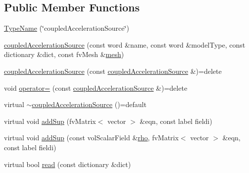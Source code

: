 \subsection*{Public Member Functions}
\begin{DoxyCompactItemize}
\item 
\hyperlink{classFoam_1_1fv_1_1coupledAccelerationSource_a5f7eeaec46b2fdf437db166c14c02bdd}{Type\+Name} (\char`\"{}coupled\+Acceleration\+Source\char`\"{})
\item 
\hyperlink{classFoam_1_1fv_1_1coupledAccelerationSource_af602dd4c3a64d8abdf58db6290d1f774}{coupled\+Acceleration\+Source} (const word \&name, const word \&model\+Type, const dictionary \&dict, const fv\+Mesh \&\hyperlink{createMeshesPostProcess_8H_a8bb1e58291d2d2b653e024a4f4bffe38}{mesh})
\item 
\hyperlink{classFoam_1_1fv_1_1coupledAccelerationSource_aa2a92d3cd5793fb4d2c14fd49a4abcdd}{coupled\+Acceleration\+Source} (const \hyperlink{classFoam_1_1fv_1_1coupledAccelerationSource}{coupled\+Acceleration\+Source} \&)=delete
\item 
void \hyperlink{classFoam_1_1fv_1_1coupledAccelerationSource_ab9fab09a6c8e6dd7402c6ebd6c46adaa}{operator=} (const \hyperlink{classFoam_1_1fv_1_1coupledAccelerationSource}{coupled\+Acceleration\+Source} \&)=delete
\item 
virtual \hyperlink{classFoam_1_1fv_1_1coupledAccelerationSource_a28e56f77c2b3ac285c938747d9e383b4}{$\sim$coupled\+Acceleration\+Source} ()=default
\item 
virtual void \hyperlink{classFoam_1_1fv_1_1coupledAccelerationSource_acc46a837211b94ef481dfe3c66ea3a87}{add\+Sup} (fv\+Matrix$<$ vector $>$ \&eqn, const label fieldi)
\item 
virtual void \hyperlink{classFoam_1_1fv_1_1coupledAccelerationSource_adc84a8ca9dcd47957cde0e01aadd984f}{add\+Sup} (const vol\+Scalar\+Field \&\hyperlink{EEqn__1pl_8H_ac955f87ac2b79f02f420cae087fc52b1}{rho}, fv\+Matrix$<$ vector $>$ \&eqn, const label fieldi)
\item 
virtual bool \hyperlink{classFoam_1_1fv_1_1coupledAccelerationSource_a6ce0c64db98eb6144d363dbfc86104eb}{read} (const dictionary \&dict)
\end{DoxyCompactItemize}
